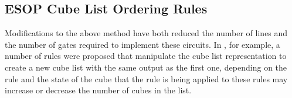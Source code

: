 \subsection{ESOP Cube List Ordering Rules}


Modifications to the above method %
have both reduced the number of lines and the number of gates required to implement these circuits. %
In \cite{Nayeem2011}, for example, a number of rules were proposed that manipulate the cube list representation to create a new cube list with 
the same output as the first one, 
depending on the rule and the state of the cube that the rule is being applied to these rules may increase 
or decrease the number of cubes in the list.\\


